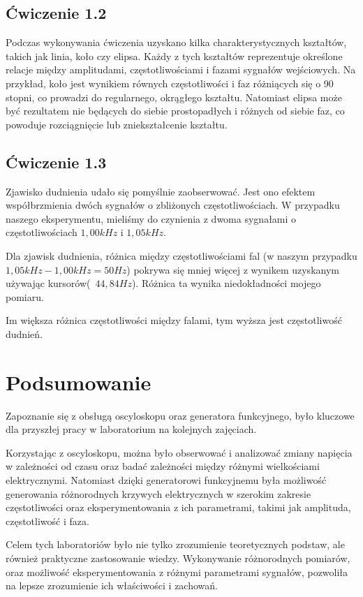 \documentclass{article}
\begin{document}
        \subsection{Ćwiczenie 1.2}
          Podczas wykonywania ćwiczenia uzyskano kilka charakterystycznych kształtów, takich jak linia, koło czy elipsa. Każdy z tych kształtów reprezentuje określone relacje między amplitudami, częstotliwościami i fazami sygnałów wejściowych.
          Na przykład, koło jest wynikiem równych częstotliwości i faz różniących się o 90 stopni, co prowadzi do regularnego, okrągłego kształtu. Natomiast elipsa może być rezultatem nie będących do siebie prostopadłych i różnych od siebie faz, co powoduje rozciągnięcie lub zniekształcenie kształtu.
        \subsection{Ćwiczenie 1.3}
        Zjawisko dudnienia udało się pomyślnie zaobserwować. Jest ono efektem współbrzmienia dwóch sygnałów o zbliżonych częstotliwościach. W przypadku naszego eksperymentu, mieliśmy do czynienia z dwoma sygnałami o częstotliwościach $1,00 kHz$ i $1,05 kHz$.

        Dla zjawisk dudnienia, różnica między częstotliwościami fal (w naszym przypadku $1,05 kHz - 1,00 kHz = 50 Hz$) pokrywa się mniej więcej z wynikem uzyskanym używając kursorów(~$44,84Hz$). Różnica ta wynika niedokładności mojego pomiaru.

        Im większa różnica częstotliwości między falami, tym wyższa jest częstotliwość dudnień.

  \section{Podsumowanie}
    Zapoznanie się z obsługą oscyloskopu oraz generatora funkcyjnego, było kluczowe dla przyszłej pracy w laboratorium na kolejnych zajęciach.

    Korzystając z oscyloskopu, można było obserwować i analizować zmiany napięcia w zależności od czasu oraz badać zależności między różnymi wielkościami elektrycznymi. Natomiast dzięki generatorowi funkcyjnemu była możliwość generowania różnorodnych krzywych elektrycznych w szerokim zakresie częstotliwości oraz eksperymentowania z ich parametrami, takimi jak amplituda, częstotliwość i faza.

    Celem tych laboratoriów było nie tylko zrozumienie teoretycznych podstaw, ale również praktyczne zastosowanie wiedzy. Wykonywanie różnorodnych pomiarów, oraz możliwość eksperymentowania z różnymi parametrami sygnałów, pozwoliła na lepsze zrozumienie ich właściwości i zachowań.
    
\end{document}
